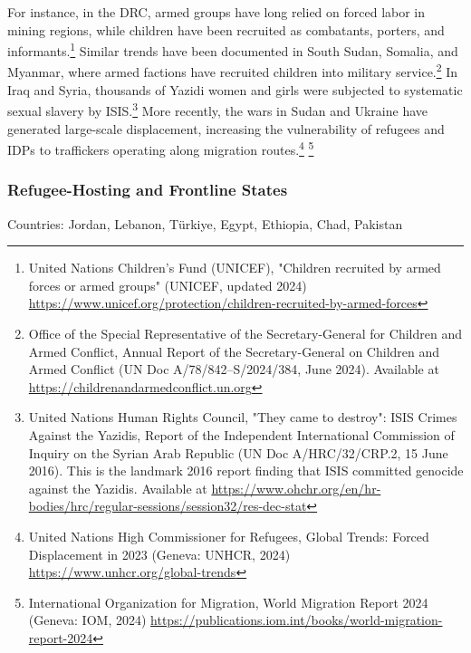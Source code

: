 For instance, in the DRC, armed groups have long relied on forced labor in mining regions, while children have been recruited as combatants, porters, and informants.\footnote{United Nations Children's Fund (UNICEF), "Children recruited by armed forces or armed groups" (UNICEF, updated 2024) \url{https://www.unicef.org/protection/children-recruited-by-armed-forces}} Similar trends have been documented in South Sudan, Somalia, and Myanmar, where armed factions have recruited children into military service.\footnote{Office of the Special Representative of the Secretary-General for Children and Armed Conflict, Annual Report of the Secretary-General on Children and Armed Conflict (UN Doc A/78/842–S/2024/384, June 2024). Available at \url{https://childrenandarmedconflict.un.org}} In Iraq and Syria, thousands of Yazidi women and girls were subjected to systematic sexual slavery by ISIS.\footnote{United Nations Human Rights Council, "They came to destroy": ISIS Crimes Against the Yazidis, Report of the Independent International Commission of Inquiry on the Syrian Arab Republic (UN Doc A/HRC/32/CRP.2, 15 June 2016). This is the landmark 2016 report finding that ISIS committed genocide against the Yazidis. Available at \url{https://www.ohchr.org/en/hr-bodies/hrc/regular-sessions/session32/res-dec-stat}} More recently, the wars in Sudan and Ukraine have generated large-scale displacement, increasing the vulnerability of refugees and IDPs to traffickers operating along migration routes.\footnote{United Nations High Commissioner for Refugees, Global Trends: Forced Displacement in 2023 (Geneva: UNHCR, 2024) \url{https://www.unhcr.org/global-trends}} \footnote{International Organization for Migration, World Migration Report 2024 (Geneva: IOM, 2024) \url{https://publications.iom.int/books/world-migration-report-2024}}

\subsubsection{Refugee-Hosting and Frontline States}

Countries: Jordan, Lebanon, Türkiye, Egypt, Ethiopia, Chad, Pakistan

